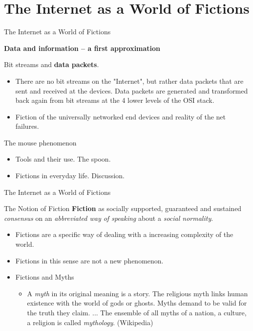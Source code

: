\documentclass{beamer}
\title{Modelling Sustainable Systems\\ and Semantic Web\\[6pt] Data and
  Information \vskip1em}
\subtitle{Lecture in the Module 10-202-2309\\ for Master Computer Science}
\author{Prof. Dr. Hans-Gert Gräbe\\
\url{http://www.informatik.uni-leipzig.de/~graebe}}
\date{June 2021}
\newcommand{\ueberschrift}[1]{\begin{center}\bf #1\end{center}}
\begin{document}
{
\begin{frame}
  \titlepage
\end{frame}}

\section{The Internet as a World of Fictions}
\begin{frame}{The Internet as a World of Fictions}
  
\ueberschrift{Data and information -- a first approximation}

Bit streams and \textbf{data packets}.
\begin{itemize}
\item There are no bit streams on the "Internet", but rather data packets that
  are sent and received at the devices.  Data packets are generated and
  transformed back again from bit streams at the 4 lower levels of the OSI
  stack.
\item Fiction of the universally networked end devices and reality of the net
  failures.
\end{itemize}
The mouse phenomenon
\begin{itemize}
\item Tools and their use. The spoon.
\item Fictions in everyday life. Discussion.
\end{itemize}\vspace*{2em}
\end{frame}

\begin{frame}{The Internet as a World of Fictions}

\begin{block}{The Notion of Fiction}
  \textbf{Fiction} as socially supported, guaranteed and sustained
  \emph{consensus} on an \emph{abbreviated way of speaking} about a
  \emph{social normality}.
\end{block}
\begin{itemize}
\item Fictions are a specific way of dealing with a increasing complexity of
  the world.
\item Fictions in this sense are not a new phenomenon.
\item Fictions and Myths
  \begin{itemize}
  \item A \emph{myth} in its original meaning is a story. The religious myth
    links human existence with the world of gods or ghosts. Myths demand to be
    valid for the truth they claim. ... The ensemble of all myths of a nation,
    a culture, a religion is called \emph{mythology}.  (Wikipedia)
  \end{itemize}
\end{itemize}
\end{frame}
\end{document}
